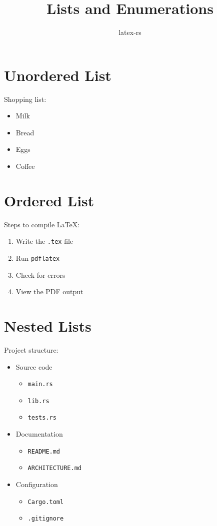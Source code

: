 \documentclass{article}
\title{Lists and Enumerations}
\author{latex-rs}
\begin{document}
\maketitle

\section{Unordered List}

Shopping list:
\begin{itemize}
    \item Milk
    \item Bread
    \item Eggs
    \item Coffee
\end{itemize}

\section{Ordered List}

Steps to compile LaTeX:
\begin{enumerate}
    \item Write the \texttt{.tex} file
    \item Run \texttt{pdflatex}
    \item Check for errors
    \item View the PDF output
\end{enumerate}

\section{Nested Lists}

Project structure:
\begin{itemize}
    \item Source code
    \begin{itemize}
        \item \texttt{main.rs}
        \item \texttt{lib.rs}
        \item \texttt{tests.rs}
    \end{itemize}
    \item Documentation
    \begin{itemize}
        \item \texttt{README.md}
        \item \texttt{ARCHITECTURE.md}
    \end{itemize}
    \item Configuration
    \begin{itemize}
        \item \texttt{Cargo.toml}
        \item \texttt{.gitignore}
    \end{itemize}
\end{itemize}
\end{document}
